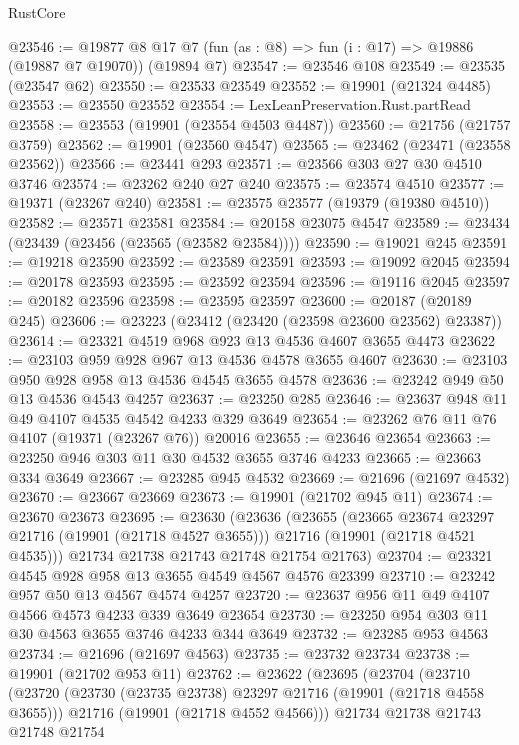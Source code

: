 \begin{lexlean}{RustCore}
\begin{coremodule}
@23546 := @19877 @8 @17 @7 (fun (as : @8) => fun (i : @17) => @19886 (@19887 @7 @19070)) (@19894 @7)
@23547 := @23546 @108
@23549 := @23535 (@23547 @62)
@23550 := @23533 @23549
@23552 := @19901 (@21324 @4485)
@23553 := @23550 @23552
@23554 := LexLeanPreservation.Rust.partRead
@23558 := @23553 (@19901 (@23554 @4503 @4487))
@23560 := @21756 (@21757 @3759)
@23562 := @19901 (@23560 @4547)
@23565 := @23462 (@23471 (@23558 @23562))
@23566 := @23441 @293
@23571 := @23566 @303 @27 @30 @4510 @3746
@23574 := @23262 @240 @27 @240
@23575 := @23574 @4510
@23577 := @19371 (@23267 @240)
@23581 := @23575 @23577 (@19379 (@19380 @4510))
@23582 := @23571 @23581
@23584 := @20158 @23075 @4547
@23589 := @23434 (@23439 (@23456 (@23565 (@23582 @23584))))
@23590 := @19021 @245
@23591 := @19218 @23590
@23592 := @23589 @23591
@23593 := @19092 @2045
@23594 := @20178 @23593
@23595 := @23592 @23594
@23596 := @19116 @2045
@23597 := @20182 @23596
@23598 := @23595 @23597
@23600 := @20187 (@20189 @245)
@23606 := @23223 (@23412 (@23420 (@23598 @23600 @23562) @23387))
@23614 := @23321 @4519 @968 @923 @13 @4536 @4607 @3655 @4473
@23622 := @23103 @959 @928 @967 @13 @4536 @4578 @3655 @4607
@23630 := @23103 @950 @928 @958 @13 @4536 @4545 @3655 @4578
@23636 := @23242 @949 @50 @13 @4536 @4543 @4257
@23637 := @23250 @285
@23646 := @23637 @948 @11 @49 @4107 @4535 @4542 @4233 @329 @3649
@23654 := @23262 @76 @11 @76 @4107 (@19371 (@23267 @76)) @20016
@23655 := @23646 @23654
@23663 := @23250 @946 @303 @11 @30 @4532 @3655 @3746 @4233
@23665 := @23663 @334 @3649
@23667 := @23285 @945 @4532
@23669 := @21696 (@21697 @4532)
@23670 := @23667 @23669
@23673 := @19901 (@21702 @945 @11)
@23674 := @23670 @23673
@23695 := @23630
    (@23636
      (@23655
        (@23665 @23674 @23297 @21716 (@19901 (@21718 @4527 @3655)))
        @21716
        (@19901 (@21718 @4521 @4535)))
      @21734
      @21738
      @21743
      @21748
      @21754
      @21763)
@23704 := @23321 @4545 @928 @958 @13 @3655 @4549 @4567 @4576 @23399
@23710 := @23242 @957 @50 @13 @4567 @4574 @4257
@23720 := @23637 @956 @11 @49 @4107 @4566 @4573 @4233 @339 @3649 @23654
@23730 := @23250 @954 @303 @11 @30 @4563 @3655 @3746 @4233 @344 @3649
@23732 := @23285 @953 @4563
@23734 := @21696 (@21697 @4563)
@23735 := @23732 @23734
@23738 := @19901 (@21702 @953 @11)
@23762 := @23622
    (@23695
      (@23704
        (@23710
          (@23720
            (@23730 (@23735 @23738) @23297 @21716 (@19901 (@21718 @4558 @3655)))
            @21716
            (@19901 (@21718 @4552 @4566)))
          @21734
          @21738
          @21743
          @21748
          @21754

\end{coremodule}
\end{lexlean}
